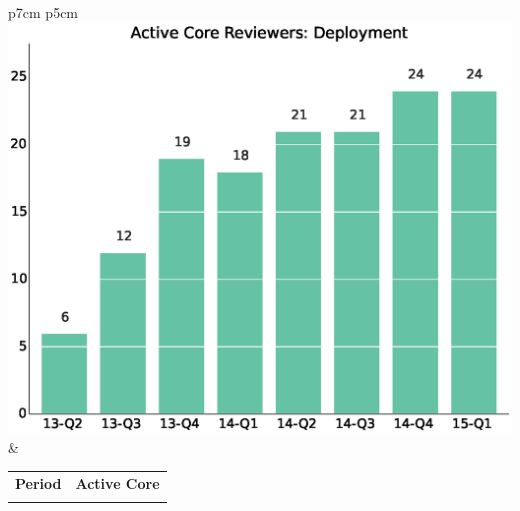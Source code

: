 \documentclass[a4wide,11pt]{article}
\begin{document}
\begin{tabular}{p{7cm} p{5cm}}
    \vspace{0pt} 
    \includegraphics[scale=.35]{figs/active_core_scrDeployment.eps}
    & 
    \vspace{0pt}
    \begin{tabular}{l|l}%
    \bfseries Period & \bfseries Active Core %
    \csvreader[head to column names]{data/active_core_scrDeployment.csv}{}%
    {\\ & \activecorereviewers}
    \end{tabular}
\end{tabular}
\end{document}
